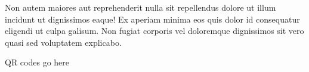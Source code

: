 \documentclass{article}%
\begin{document}
\newline%
Non autem maiores aut reprehenderit nulla sit repellendus dolore ut illum incidunt ut dignissimos eaque! Ex aperiam minima eos quis dolor id consequatur eligendi ut culpa galisum. Non fugiat corporis vel doloremque dignissimos sit vero quasi sed voluptatem explicabo.\newline%
\newline%
%
\vspace*{30pt}%
\begin{center}%
\begin{Huge}%
QR codes go here%
\end{Huge}%
\end{center}%
\newpage%
\end{document}
